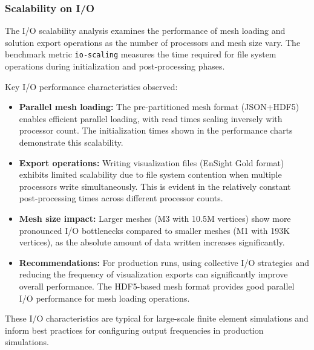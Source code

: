 \subsubsection{Scalability on I/O}

The I/O scalability analysis examines the performance of mesh loading and solution export operations as the number of processors and mesh size vary. The benchmark metric \texttt{io-scaling} measures the time required for file system operations during initialization and post-processing phases.

Key I/O performance characteristics observed:
\begin{itemize}
\item \textbf{Parallel mesh loading:} The pre-partitioned mesh format (JSON+HDF5) enables efficient parallel loading, with read times scaling inversely with processor count. The initialization times shown in the performance charts demonstrate this scalability.

\item \textbf{Export operations:} Writing visualization files (EnSight Gold format) exhibits limited scalability due to file system contention when multiple processors write simultaneously. This is evident in the relatively constant post-processing times across different processor counts.

\item \textbf{Mesh size impact:} Larger meshes (M3 with 10.5M vertices) show more pronounced I/O bottlenecks compared to smaller meshes (M1 with 193K vertices), as the absolute amount of data written increases significantly.

\item \textbf{Recommendations:} For production runs, using collective I/O strategies and reducing the frequency of visualization exports can significantly improve overall performance. The HDF5-based mesh format provides good parallel I/O performance for mesh loading operations.
\end{itemize}

These I/O characteristics are typical for large-scale finite element simulations and inform best practices for configuring output frequencies in production simulations.
